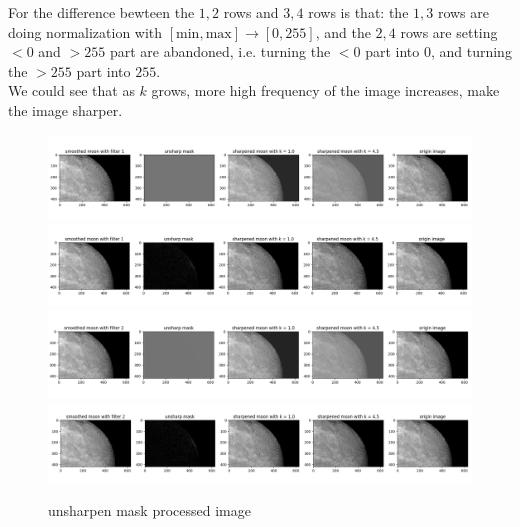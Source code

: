 For the difference bewteen the $1,2$ rows and $3,4$ rows is that: the $1,3$ rows are doing normalization with $[\text{min},\text{max}]\to[0,255]$,
and the $2,4$ rows are setting $<0$ and $>255$ part are abandoned, i.e. turning the $<0$ part into $0$, and turning the $>255$ part into $255$.\\
We could see that as $k$ grows, more high frequency of the image increases, make the image sharper.\\

\begin{figure}[htbp]
    \centering
	\includegraphics[width=\textwidth]{../images/p2/p2c_1_no_drop.png}
	\includegraphics[width=\textwidth]{../images/p2/p2c_1_drop.png}
    \includegraphics[width=\textwidth]{../images/p2/p2c_2_no_drop.png}
	\includegraphics[width=\textwidth]{../images/p2/p2c_2_drop.png}
    \caption{unsharpen mask processed image}
\label{fig:p2c}
\end{figure}

\newpage